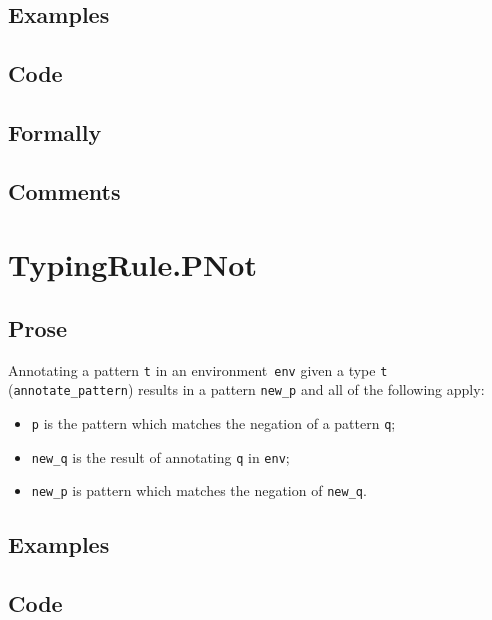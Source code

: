 \documentclass{book}
\begin{document}
  \subsection{Examples}

  \subsection{Code}

  \subsection{Formally}

  \subsection{Comments}
 
\section{TypingRule.PNot \label{sec:TypingRule.PNot}}

  \subsection{Prose}
   Annotating a pattern \texttt{t} in an environment~\texttt{env} given a type \texttt{t} (\texttt{annotate\_pattern}) results in a pattern \texttt{new\_p} and all of the following apply:
   \begin{itemize}
   \item \texttt{p} is the pattern which matches the negation of a pattern \texttt{q};
   \item \texttt{new\_q} is the result of annotating \texttt{q} in \texttt{env}; 
   \item \texttt{new\_p} is pattern which matches the negation of \texttt{new\_q}.
   \end{itemize}

  \subsection{Examples}

  \subsection{Code}
\end{document}
